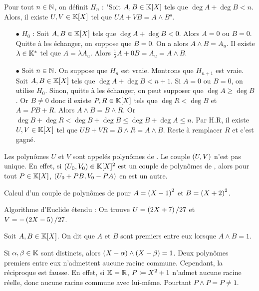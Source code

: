 \documentclass{magnolia}
\begin{document}
\begin{preuve}
Pour tout $n\in \mathbb{N}$, on définit $H_n$ : "Soit $A,B \in \polyK$ tels que $\deg A+\deg B<n$. Alors, il existe $U,V \in \polyK$ tel que $UA+VB=A\wedge B$".
\begin{itemize}
\item[$\bullet$] $H_0$ : Soit $A,B \in \polyK$ tels que $\deg A+\deg B<0$. Alors $A=0$ ou $B=0$. Quitte à les échanger, on suppose que $B=0$. On a alors $A\wedge B=A_u$. Il existe $\lambda \in \mathbb{K}^*$ tel que $A=\lambda A_u$. Alors $\frac{1}{\lambda}A+0B=A_u=A\wedge B$.
\item[$\bullet$] Soit $n\in \mathbb{N}$. On suppose que $H_n$ est vraie. Montrons que $H_{n+1}$ est vraie. Soit $A,B \in \polyK$ tels que $\deg A+\deg B<n+1$. Si $A=0$ ou $B=0$, on utilise $H_0$. Sinon, quitte à les échanger, on peut supposer que $\deg A\geq \deg B$. Or $B\neq 0$ donc il existe $P,R\in \polyK$ tels que $\deg R < \deg B$ et $A=PB+R$. Alors $A\wedge B= B\wedge R$. Or $\deg B+\deg R <\deg B+\deg B\leq \deg B+\deg A \leq n$. Par H.R, il existe $U,V \in \polyK$ tel que $UB+VR=B\wedge R=A\wedge B$. Reste à remplacer $R$ et c'est gagné.
\end{itemize}
\end{preuve}

\begin{remarques}
\remarque Les polynômes $U$ et $V$ sont appelés polynômes de .
\remarque Le couple $\left(U,V\right)$ n'est pas unique. En effet,
  si $\p{U_0,V_0}\in\polyK^2$ est un couple de polynômes de , alors pour
  tout $P\in\polyK$, $\left(U_0+PB,V_0-PA\right)$ en est un autre.
\end{remarques}

\begin{exoUnique}
\exo Calcul d'un couple de polynômes de  pour $A=\left(X-1\right)^2$ et
  $B=\left(X+2\right)^2$.
  \begin{sol}
  Algorithme d'Euclide étendu :
   On trouve $U=\left(2X+7\right)/27$ et $V=-\left(2X-5\right)/27$.    
  \end{sol}
\end{exoUnique}

\begin{definition}
Soit $A,B\in\polyK$. On dit que $A$ et $B$ sont premiers entre eux lorsque
$A\wedge B=1$.
\end{definition}

\begin{remarques}
\remarque Si $\alpha,\beta\in\mathbb{K}$ sont distincts, alors
  $\left(X-\alpha\right)\wedge\left(X-\beta\right)=1$.
\remarque Deux polynômes premiers entre eux n'admettent aucune racine commune.
  Cependant, la réciproque est fausse. En effet, si $\mathbb{K}=\mathbb{R}$, $P\coloneqq X^2+1$ n'admet
  aucune racine réelle, donc aucune racine commune avec lui-même.
  Pourtant $P\wedge P=P\neq 1$.
\end{remarques}
\end{document}

